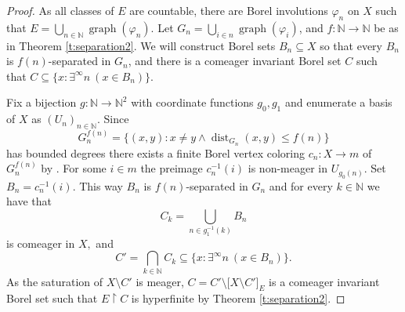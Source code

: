 \documentclass[10pt,a4paper]{article}
\newcommand{\N}{\mathbb{N}}
\renewcommand{\restriction}[2]{#1 \upharpoonright #2}
\theoremstyle{definition}
\numberwithin{equation}{section}
\DeclareMathOperator{\graph}{graph}
\DeclareMathOperator{\dist}{dist}
\newcommand{\rstr}{\restriction}
\newcommand{\vfi}{\varphi}
\newcommand{\sse}{\subseteq}
\begin{document}
	\begin{proof}
		As all classes of $E$ are countable, there are Borel involutions $\vfi_n$ on $X$ such that $E=\bigcup_{n\in\N}\graph(\vfi_n)$. Let $G_n=\bigcup_{i\in n}\graph(\vfi_i)$, and $f:\N\to \N$ be as in Theorem \ref{t:separation2}. We will construct Borel sets $B_n \subseteq X$ so that every $B_n$ is $f(n)$-separated in $G_n$, and there is a comeager invariant Borel set $C$ such that $C\sse\{x:\exists^\infty n \ (x \in B_n)\}$. 
		
		Fix a bijection $g:\N\to\N^2$ with coordinate functions $g_0,g_1$ and enumerate a basis of $X$ as $(U_n)_{n\in\N}.$ Since \[G_n^{f(n)}=\{(x,y):x\neq y \wedge \dist_{G_n}(x,y)\le f(n) \}\]  has bounded degrees there exists a finite Borel vertex coloring $c_n:X\to m$ of $G_n^{f(n)}$ by \cite{KST}. For some $i\in m$ the preimage $c_n^{-1}(i)$ is non-meager in $U_{g_0(n)}.$ Set $B_n=c_n^{-1}(i).$ This way $B_n$ is $f(n)$-separated in $G_n$ and for every $k\in\N$ we have that
		\[C_k=\bigcup_{n\in g_1^{-1}(k)}B_n\]
		is comeager in $X,$ and 
		\[C'=\bigcap_{k\in\N}C_k\sse \{x:\exists^\infty n \ (x \in B_n)\}.\]
		As the saturation of $X\setminus C'$ is meager, $C =C'\setminus\big[X\setminus C'\big]_E$ is a comeager invariant Borel set such that $\rstr{E}{C}$ is hyperfinite by Theorem \ref{t:separation2}.
	\end{proof}



\end{document}
